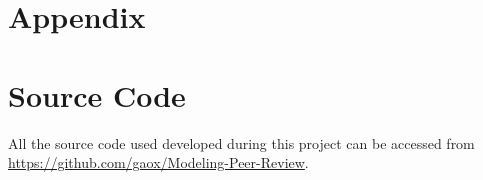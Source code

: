 \documentclass[11pt]{article}
\begin{document}
\newpage

\section{Appendix}
\appendix
\section{Source Code}
All the source code used developed during this project can be accessed from \url{https://github.com/gaox/Modeling-Peer-Review}.


















\end{document}
